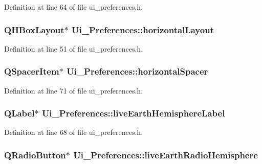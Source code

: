 Definition at line 64 of file ui\_\-preferences.h.

\hypertarget{classUi__Preferences_af7c637ac0c6eb90257bbdac6024e3975}{
\subsubsection[{horizontalLayout}]{\setlength{\rightskip}{0pt plus 5cm}QHBoxLayout$\ast$ {\bf Ui\_\-Preferences::horizontalLayout}}}
\label{classUi__Preferences_af7c637ac0c6eb90257bbdac6024e3975}


Definition at line 51 of file ui\_\-preferences.h.

\hypertarget{classUi__Preferences_a09701ca4cfd864456cd57537ff8f1dff}{
\subsubsection[{horizontalSpacer}]{\setlength{\rightskip}{0pt plus 5cm}QSpacerItem$\ast$ {\bf Ui\_\-Preferences::horizontalSpacer}}}
\label{classUi__Preferences_a09701ca4cfd864456cd57537ff8f1dff}


Definition at line 71 of file ui\_\-preferences.h.

\hypertarget{classUi__Preferences_a3df3e087ec1aad1431fdf2f3094ab18f}{
\subsubsection[{liveEarthHemisphereLabel}]{\setlength{\rightskip}{0pt plus 5cm}QLabel$\ast$ {\bf Ui\_\-Preferences::liveEarthHemisphereLabel}}}
\label{classUi__Preferences_a3df3e087ec1aad1431fdf2f3094ab18f}


Definition at line 68 of file ui\_\-preferences.h.

\hypertarget{classUi__Preferences_a36bc1ebcafd8d193a799520bf4f3e3e1}{
\subsubsection[{liveEarthRadioHemisphere}]{\setlength{\rightskip}{0pt plus 5cm}QRadioButton$\ast$ {\bf Ui\_\-Preferences::liveEarthRadioHemisphere}}}
\label{classUi__Preferences_a36bc1ebcafd8d193a799520bf4f3e3e1}


